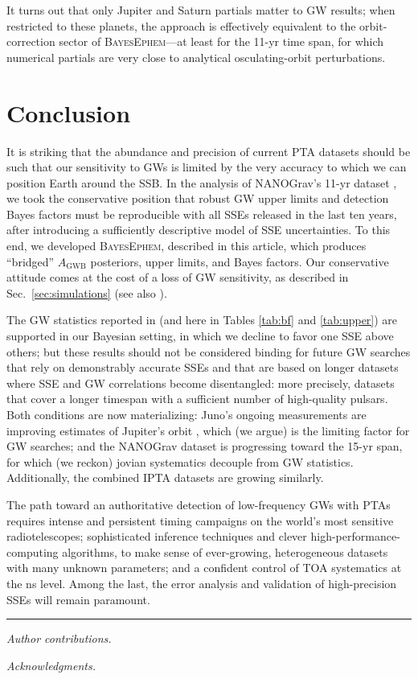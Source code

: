 \documentclass[iop,apj,twocolappendix]{emulateapj}
\begin{document}
\begin{itemize}
    It turns out that only Jupiter and Saturn partials matter to GW results; when restricted to these planets, the approach is effectively equivalent to the orbit-correction sector of \textsc{BayesEphem}---at least for the 11-yr time span, for which numerical partials are very close to analytical osculating-orbit perturbations.
\end{itemize}

\section{Conclusion}
\label{sec:conclusion}

It is striking that the abundance and precision of current PTA datasets should be such that our sensitivity to GWs is limited by the very accuracy to which we can position Earth around the SSB.
In the analysis of NANOGrav's 11-yr dataset \citep{2018ApJ...859...47A}, we took the conservative position that robust GW upper limits and detection Bayes factors must be reproducible with all SSEs released in the last ten years, after introducing a sufficiently descriptive model of SSE uncertainties.
To this end, we developed \textsc{BayesEphem}, described in this article, which produces ``bridged'' $A_\mathrm{GWB}$ posteriors, upper limits, and Bayes factors.
Our conservative attitude comes at the cost of a loss of GW sensitivity, as described in Sec.\ \ref{sec:simulations} (see also \citealt{2019ApJ...876...55R}).

The GW statistics reported in \cite{2018ApJ...859...47A} (and here in Tables \ref{tab:bf} and \ref{tab:upper}) are supported in our Bayesian setting, in which we decline to favor one SSE above others; but these results should not be considered binding for future GW searches that rely on demonstrably accurate SSEs and that are based on longer datasets where SSE and GW correlations become disentangled:
more precisely, datasets that cover a longer timespan with a sufficient number of high-quality pulsars.
Both conditions are now materializing: Juno's ongoing measurements are improving estimates of Jupiter's orbit \citep{de438}, which (we argue) is the limiting factor for GW searches; and the NANOGrav dataset is progressing toward the 15-yr span, for which (we reckon) jovian systematics decouple from GW statistics.
Additionally, the combined IPTA datasets \citep{2019MNRAS.490.4666P} are growing similarly.

The path toward an authoritative detection of low-frequency GWs with PTAs requires intense and persistent timing campaigns on the world's most sensitive radiotelescopes; 
sophisticated inference techniques and clever high-performance-computing algorithms, to make sense of ever-growing, heterogeneous datasets with many unknown parameters; and a confident control of TOA systematics at the ns level. Among the last, the error analysis and validation of high-precision SSEs will remain paramount.

\begin{center}
\rule{0.25\columnwidth}{.4pt}
\end{center}

\emph{Author contributions.} 

\emph{Acknowledgments.} 

\newpage


\end{document}
